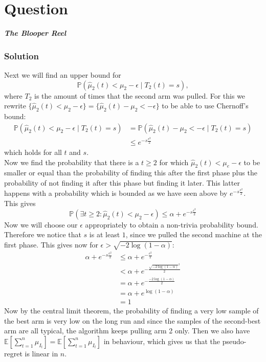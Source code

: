 \documentclass{article}
\newcounter{counterquestion}
\newenvironment{question}[1]
{
\stepcounter{counterquestion}
\section*{Question \thecounterquestion}
\emph{#1} 
} 
{
}
\newenvironment{solution}
{
\subsubsection*{Solution}
} 
{
}
\begin{document}
\begin{question}{\textbf{The Blooper Reel}}
\begin{solution}
Next we will find an upper bound for $$\mathbb{P}(\hat{\mu}_2(t)<\mu_2-\epsilon \mid T_2(t)=s),$$
where $T_2$ is the amount of times that the second arm was pulled. For this we rewrite $\{\hat{\mu}_2(t)<\mu_2-\epsilon\}=\{\hat{\mu}_2(t)-\mu_2<-\epsilon\}$ to be able to use Chernoff's bound:
\begin{align*}
\mathbb{P}(\hat{\mu}_2(t)<\mu_2-\epsilon \mid T_2(t)=s)&=\mathbb{P}(\hat{\mu}_2(t)-\mu_2<-\epsilon \mid T_2(t)=s)\\
&\leq e^{-s\frac{\epsilon ^2}{2}}
\end{align*}
which holds for all $t$ and $s$.\\
Now we find the probability that there is a $t\geq 2$ for which $\hat{\mu}_2(t)<\mu_e - \epsilon$ to be smaller or equal than the probability of finding this after the first phase plus the probability of not finding it after this phase but finding it later. This latter happens with a probability which is bounded as we have seen above by $e^{-s\frac{\epsilon ^2}{2}}$. This gives $$\mathbb{P}(\exists t \geq 2 : \hat{\mu}_2(t)<\mu_2-\epsilon)\leq \alpha + e^{-s\frac{\epsilon ^2}{2}}$$
Now we will choose our $\epsilon$ appropriately to obtain a non-trivia probability bound. Therefore we notice that $s$ is at least $1$, since we pulled the second machine at the first phase. This gives now for $\epsilon > \sqrt{-2\log (1-\alpha )}$:
\begin{align*}
\alpha + e^{-s\frac{\epsilon ^2}{2}} &\leq \alpha + e^{-\frac{\epsilon ^2}{2}} \\
&< \alpha + e^{-\frac{\sqrt{-2\log (1-\alpha )} ^2}{2}}\\
&=\alpha + e^{-\frac{-2\log (1-\alpha ) }{2}}\\
&=\alpha + e^{\log (1-\alpha )}\\
&=1
\end{align*}
Now by the central limit theorem, the probability of finding a very low sample of the best arm is very low on the long run and since the samples of the second-best arm are all typical, the algorithm keeps pulling arm 2 only. Then we also have $\mathbb{E}[\sum _{t=1} ^n \mu _{I_t}]=\mathbb{E}[\sum _{t=1} ^n \mu _{I_t}]$ in behaviour, which gives us that the pseudo-regret is linear in $n$.
\end{solution}
\end{question}
\end{document}

